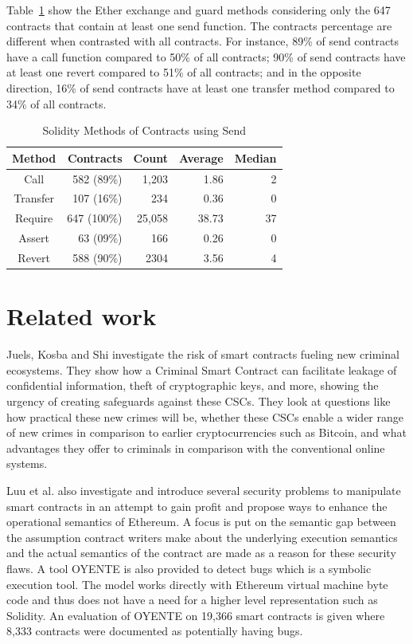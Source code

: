 \documentclass[10pt,conference]{IEEEtran}
\begin{document}
Table~\ref{tab:send} show the Ether exchange and guard methods considering only the 647 contracts that contain at least one send function. The contracts percentage are different when contrasted with all contracts. For instance, 89\% of send contracts have a call function compared to 50\% of all contracts; 90\% of send contracts have at least one revert compared to 51\% of all contracts; and in the opposite direction, 16\% of send contracts have at least one transfer method compared to 34\% of all contracts.

\begin{table}
\center
  \caption{Solidity Methods of Contracts using Send}
  \label{tab:send}
  \begin{tabular}{crrrr}
    \hline
    Method & Contracts & Count & Average & Median \\
    \hline
    Call& 582 (89\%) & 1,203 & 1.86 & 2\\
    Transfer& 107 (16\%) & 234 & 0.36 & 0\\
    Require& 647 (100\%) & 25,058 & 38.73 & 37\\
    Assert& 63 (09\%) & 166 & 0.26 & 0\\
    Revert& 588 (90\%) & 2304 & 3.56 & 4\\
    \hline
\end{tabular}
\end{table}


\section{Related work}\label{sec:related-work}


Juels, Kosba and Shi\cite{criminal} investigate the risk of smart contracts fueling new criminal ecosystems. They show how a Criminal Smart Contract can facilitate leakage of confidential information, theft of cryptographic keys, and more, showing the urgency of creating safeguards against these CSCs. They look at questions like how practical these new crimes will be, whether these CSCs enable a wider range of new crimes in comparison to earlier cryptocurrencies such as Bitcoin, and what advantages they offer to criminals in comparison with the conventional online systems.


Luu et al.  \cite{smarter} also investigate and introduce several security problems to manipulate smart contracts in an attempt to gain profit and propose ways to enhance the operational semantics of Ethereum. A focus is put on the semantic gap between the assumption contract writers make about the underlying execution semantics and the actual semantics of the contract are made as a reason for these security flaws. A tool OYENTE is also provided to detect bugs which is a symbolic execution tool. The model works directly with Ethereum virtual machine byte code and thus does not have a need for a higher level representation such as Solidity. An evaluation of OYENTE on 19,366 smart contracts is given where 8,333 contracts were documented as potentially having bugs.
\end{document}
